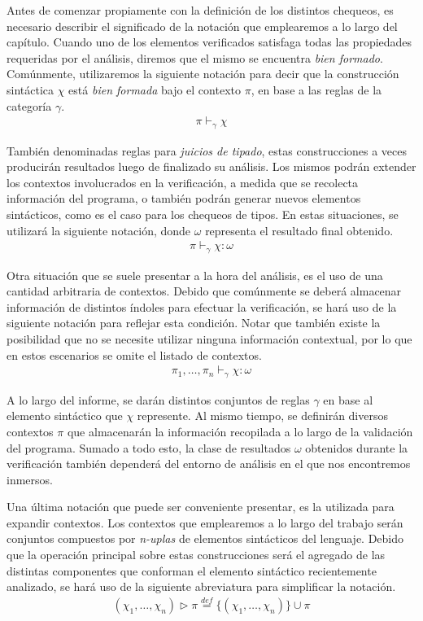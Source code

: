 Antes de comenzar propiamente con la definición de los distintos chequeos, es necesario describir el significado de la notación que emplearemos a lo largo del capítulo.
Cuando uno de los elementos verificados satisfaga todas las propiedades requeridas por el análisis, diremos que el mismo se encuentra \textit{bien formado}.
Comúnmente, utilizaremos la siguiente notación para decir que la construcción sintáctica $\chi$ está \textit{bien formada} bajo el contexto $\pi$, en base a las reglas de la categoría $\gamma$.
\begin{gather*}
\pi \vdash_{\gamma} \chi
\end{gather*}

También denominadas reglas para \textit{juicios de tipado}, estas construcciones a veces producirán resultados luego de finalizado su análisis.
Los mismos podrán extender los contextos involucrados en la verificación, a medida que se recolecta información del programa, o también podrán generar nuevos elementos sintácticos, como es el caso para los chequeos de tipos.
En estas situaciones, se utilizará la siguiente notación, donde $\omega$ representa el resultado final obtenido.
\begin{gather*}
\pi \vdash_{\gamma} \chi : \omega
\end{gather*}

Otra situación que se suele presentar a la hora del análisis, es el uso de una cantidad arbitraria de contextos.
Debido que comúnmente se deberá almacenar información de distintos índoles para efectuar la verificación, se hará uso de la siguiente notación para reflejar esta condición.
Notar que también existe la posibilidad que no se necesite utilizar ninguna información contextual, por lo que en estos escenarios se omite el listado de contextos.
\begin{gather*}
\pi_1, \ldots, \pi_n \vdash_{\gamma} \chi : \omega
\end{gather*}

A lo largo del informe, se darán distintos conjuntos de reglas $\gamma$ en base al elemento sintáctico que $\chi$ represente.
Al mismo tiempo, se definirán diversos contextos $\pi$ que almacenarán la información recopilada a lo largo de la validación del programa.
Sumado a todo esto, la clase de resultados $\omega$ obtenidos durante la verificación también dependerá del entorno de análisis en el que nos encontremos inmersos.

Una última notación que puede ser conveniente presentar, es la utilizada para expandir contextos.
Los contextos que emplearemos a lo largo del trabajo serán conjuntos compuestos por \textit{n-uplas} de elementos sintácticos del lenguaje.
Debido que la operación principal sobre estas construcciones será el agregado de las distintas componentes que conforman el elemento sintáctico recientemente analizado, se hará uso de la siguiente abreviatura para simplificar la notación.
\begin{gather*}
(\chi_1, \ldots, \chi_n) \triangleright \pi \overset{def}{=} \{ (\chi_1, \ldots, \chi_n) \} \cup \pi
\end{gather*}

